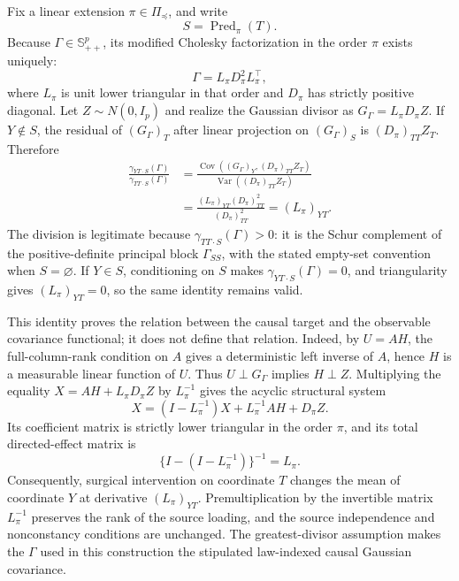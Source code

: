 Fix a linear extension \(\pi\in\Pi_{\preceq}\), and write
\[
 S=\operatorname{Pred}_{\pi}(T).
\]
Because \(\Gamma\in\mathbb S_{++}^{p}\), its modified Cholesky factorization in the order \(\pi\) exists uniquely:
\[
 \Gamma=L_{\pi}D_{\pi}^{2}L_{\pi}^{\top},
\]
where \(L_{\pi}\) is unit lower triangular in that order and \(D_{\pi}\) has strictly positive diagonal.  Let \(Z\sim N(0,I_p)\) and realize the Gaussian divisor as \(G_{\Gamma}=L_{\pi}D_{\pi}Z\).  If \(Y\notin S\), the residual of \((G_{\Gamma})_T\) after linear projection on \((G_{\Gamma})_S\) is \((D_{\pi})_{TT}Z_T\).  Therefore
\[
 \begin{aligned}
 \frac{\gamma_{YT\cdot S}(\Gamma)}{\gamma_{TT\cdot S}(\Gamma)}
 &=\frac{\operatorname{Cov}\!\left((G_{\Gamma})_Y,(D_{\pi})_{TT}Z_T\right)}
         {\operatorname{Var}\!\left((D_{\pi})_{TT}Z_T\right)}\\
 &=\frac{(L_{\pi})_{YT}(D_{\pi})_{TT}^{2}}
         {(D_{\pi})_{TT}^{2}}
 =(L_{\pi})_{YT}.
 \end{aligned}
\]
The division is legitimate because
\(\gamma_{TT\cdot S}(\Gamma)>0\): it is the Schur complement of the positive-definite principal block \(\Gamma_{SS}\), with the stated empty-set convention when \(S=\varnothing\).  If \(Y\in S\), conditioning on \(S\) makes \(\gamma_{YT\cdot S}(\Gamma)=0\), and triangularity gives \((L_{\pi})_{YT}=0\), so the same identity remains valid.

This identity proves the relation between the causal target and the observable covariance functional; it does not define that relation.  Indeed, by \(U=AH\), the full-column-rank condition on \(A\) gives a deterministic left inverse of \(A\), hence \(H\) is a measurable linear function of \(U\).  Thus \(U\perp G_{\Gamma}\) implies \(H\perp Z\).  Multiplying the equality \(X=AH+L_{\pi}D_{\pi}Z\) by \(L_{\pi}^{-1}\) gives the acyclic structural system
\[
 X=(I-L_{\pi}^{-1})X+L_{\pi}^{-1}AH+D_{\pi}Z.
\]
Its coefficient matrix is strictly lower triangular in the order \(\pi\), and its total directed-effect matrix is
\[
 \{I-(I-L_{\pi}^{-1})\}^{-1}=L_{\pi}.
\]
Consequently, surgical intervention on coordinate \(T\) changes the mean of coordinate \(Y\) at derivative \((L_{\pi})_{YT}\).  Premultiplication by the invertible matrix \(L_{\pi}^{-1}\) preserves the rank of the source loading, and the source independence and nonconstancy conditions are unchanged.  The greatest-divisor assumption makes the \(\Gamma\) used in this construction the stipulated law-indexed causal Gaussian covariance.


